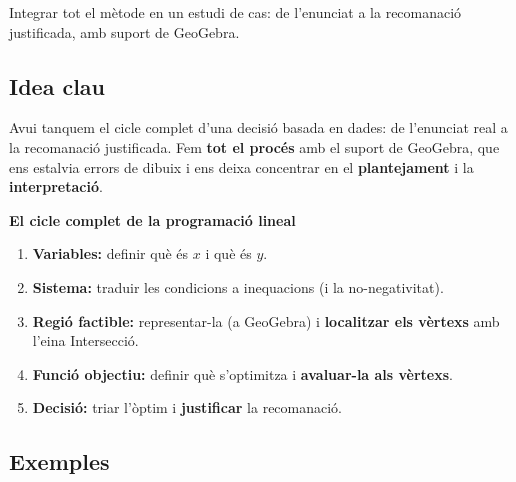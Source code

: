 %
{Integrar tot el mètode en un estudi de cas: de l'enunciat a la recomanació justificada, amb suport de GeoGebra.}

\subsection{Idea clau}

Avui tanquem el cicle complet d'una decisió basada en dades: de l'enunciat real a la
recomanació justificada. Fem \textbf{tot el procés} amb el suport de GeoGebra, que
ens estalvia errors de dibuix i ens deixa concentrar en el \textbf{plantejament} i la
\textbf{interpretació}.

\begin{idea}
\textbf{El cicle complet de la programació lineal}
\begin{enumerate}[leftmargin=1.6em, itemsep=2pt]
  \item \textbf{Variables:} definir què és $x$ i què és $y$.
  \item \textbf{Sistema:} traduir les condicions a inequacions (i la no-negativitat).
  \item \textbf{Regió factible:} representar-la (a GeoGebra) i \textbf{localitzar els
        vèrtexs} amb l'eina Intersecció.
  \item \textbf{Funció objectiu:} definir què s'optimitza i \textbf{avaluar-la als
        vèrtexs}.
  \item \textbf{Decisió:} triar l'òptim i \textbf{justificar} la recomanació.
\end{enumerate}
\end{idea}

\subsection{Exemples}

